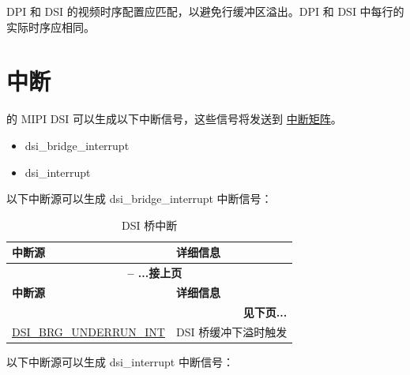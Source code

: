 \documentclass[main\_\_CN.tex]{subfiles}
\begin{document}
DPI 和 DSI 的视频时序配置应匹配，以避免行缓冲区溢出。DPI 和 DSI 中每行的实际时序应相同。


\section{中断}
\chipname{} 的 MIPI DSI 可以生成以下中断信号，这些信号将发送到 \hyperref[mod:intmtrx]{中断矩阵}。

\begin{itemize}
    \item dsi\_bridge\_interrupt
    \item dsi\_interrupt
\end{itemize}

以下中断源可以生成 dsi\_bridge\_interrupt 中断信号：

\begin{longtable}[c]{ |p{5cm}|p{10cm}| }
    \caption{DSI 桥中断}
    \label{tab:dsi-bridge-intr}\\\hline

    \rowcolor{lightgray}
    \textbf{中断源} & \textbf{详细信息} \\\hline
    \endfirsthead


    \multicolumn{2}{c}{\bfseries \tablename\ \thetable{} -- ...接上页}\\\hline
    \rowcolor{lightgray}
    \textbf{中断源} & \textbf{详细信息} \\\hline
    \endhead

    \multicolumn{2}{r}{\textbf{见下页...}} \\
    \endfoot

    \endlastfoot

    \hyperref[fielddesc:DSIBRGUNDERRUNINTRAW]{DSI\_BRG\_UNDERRUN\_INT} &  DSI 桥缓冲下溢时触发 \\\hline
        

\end{longtable}

以下中断源可以生成 dsi\_interrupt 中断信号：
\end{document}
